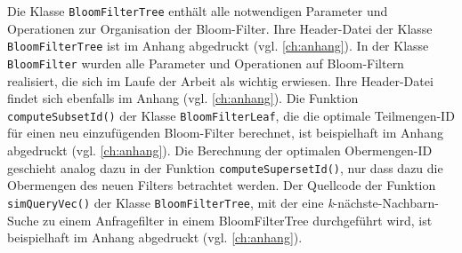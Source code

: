 Die Klasse \texttt{BloomFilterTree} enthält alle notwendigen Parameter und Operationen zur Organisation der Bloom-Filter. Ihre Header-Datei der Klasse \texttt{BloomFilterTree} ist im Anhang abgedruckt (vgl. \ref{ch:anhang}). In der Klasse \texttt{BloomFilter} wurden alle Parameter und Operationen auf Bloom-Filtern realisiert, die sich im Laufe der Arbeit als wichtig erwiesen. Ihre Header-Datei findet sich ebenfalls im Anhang (vgl. \ref{ch:anhang}). Die Funktion \texttt{computeSubsetId()} der Klasse \texttt{BloomFilterLeaf}, die die optimale Teilmengen-ID für einen neu einzufügenden Bloom-Filter berechnet, ist beispielhaft im Anhang abgedruckt (vgl. \ref{ch:anhang}). Die Berechnung der optimalen Obermengen-ID geschieht analog dazu in der Funktion \texttt{computeSupersetId()}, nur dass dazu die Obermengen des neuen Filters betrachtet werden. Der Quellcode der Funktion \mbox{\texttt{simQueryVec()}} der Klasse \texttt{BloomFilterTree}, mit der eine \textit{k}-nächste-Nachbarn-Suche zu einem Anfragefilter in einem BloomFilterTree durchgeführt wird, ist beispielhaft im Anhang abgedruckt (vgl. \ref{ch:anhang}). 

